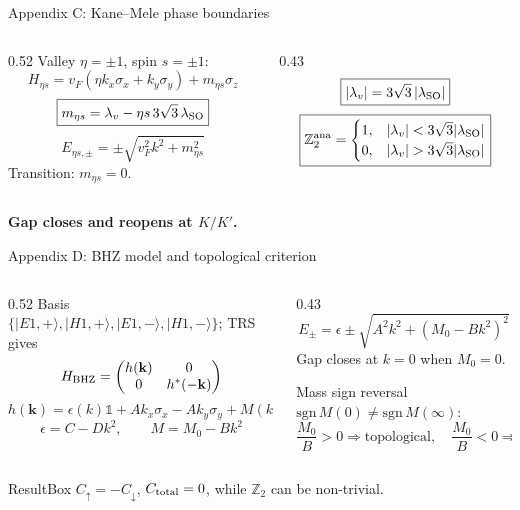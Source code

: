 \documentclass[aspectratio=169,11pt]{beamer}
\newcommand{\ANA}{\mathrm{ana}}
\newenvironment{ResultBox}
{\begin{beamercolorbox}[rounded=true,sep=0.40em]{ResultBox}}
{\end{beamercolorbox}}
\begin{document}
\begin{frame}{Appendix C: Kane--Mele phase boundaries}
\scriptsize
\begin{columns}[T]
\begin{column}{0.52\textwidth}
Valley $\eta=\pm1$, spin $s=\pm1$:
\[
H_{\eta s}=v_F(\eta k_x\sigma_x+k_y\sigma_y)+m_{\eta s}\sigma_z
\]
\[
\boxed{m_{\eta s}=\lambda_v-\eta s\,3\sqrt3\,\lambda_{\rm SO}}
\]
\[
E_{\eta s,\pm}=\pm\sqrt{v_F^2k^2+m_{\eta s}^2}
\]
Transition: $m_{\eta s}=0$.
\end{column}
\begin{column}{0.43\textwidth}
\[
\boxed{|\lambda_v|=3\sqrt3\,|\lambda_{\rm SO}|}
\]
\[
\boxed{
\mathbb Z_2^{\ANA}=\begin{cases}
1,&|\lambda_v|<3\sqrt3|\lambda_{\rm SO}|\\
0,&|\lambda_v|>3\sqrt3|\lambda_{\rm SO}|
\end{cases}}
\]
\end{column}
\end{columns}
\vfill
\centering\textbf{Gap closes and reopens at $K/K'$.}
\end{frame}

\begin{frame}{Appendix D: BHZ model and topological criterion}
\scriptsize
\begin{columns}[T]
\begin{column}{0.52\textwidth}
Basis $\{|E1,+\rangle,|H1,+\rangle,|E1,-\rangle,|H1,-\rangle\}$; TRS gives
\[
H_{\rm BHZ}=\begin{pmatrix}h(\mathbf k)&0\\0&h^*(-\mathbf k)\end{pmatrix}
\]
\[
h(\mathbf k)=\epsilon(k)\mathbb 1+Ak_x\sigma_x-Ak_y\sigma_y+M(k)\sigma_z
\]
\[
\epsilon=C-Dk^2,\qquad M=M_0-Bk^2
\]
\end{column}
\begin{column}{0.43\textwidth}
\[
E_\pm=\epsilon\pm\sqrt{A^2k^2+(M_0-Bk^2)^2}
\]
Gap closes at $k=0$ when $\boxed{M_0=0}$.

Mass sign reversal $\mathrm{sgn}\,M(0)\neq\mathrm{sgn}\,M(\infty)$:
\[
\frac{M_0}{B}>0\Rightarrow\text{topological},\quad
\frac{M_0}{B}<0\Rightarrow\text{trivial}
\]
\end{column}
\end{columns}
\vfill
\begin{ResultBox}\centering
$C_\uparrow=-C_\downarrow$, $C_{\rm total}=0$, while $\mathbb Z_2$ can be non-trivial.
\end{ResultBox}
\end{frame}
\end{document}
